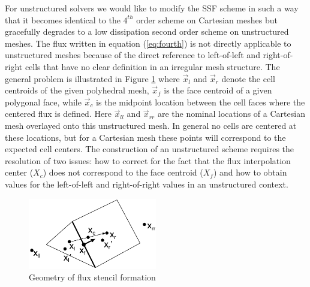 For unstructured solvers we would like to modify the SSF scheme in
such a way that it becomes identical to the $4^{th}$ order scheme on
Cartesian meshes but gracefully degrades to a low dissipation second
order scheme on unstructured meshes.  The flux written in equation
(\ref{eq:fourth}) is not directly applicable to unstructured meshes
because of the direct reference to left-of-left and right-of-right
cells that have no clear definition in an irregular mesh structure.
The general problem is illustrated in Figure \ref{fig:stencil}
where $\vec{x}_l$ and $\vec{x}_r$ denote the cell centroids of the
given polyhedral mesh, $\vec{x}_f$ is the face centroid of a given
polygonal face, while $\vec{x}_c$ is the midpoint location between
the cell faces where the centered flux is defined.  Here
$\vec{x}_{ll}$ and $\vec{x}_{rr}$ are the nominal locations of a
Cartesian mesh overlayed onto this unstructured mesh.  In general no
cells are centered at these locations, but for a Cartesian mesh these
points will correspond to the expected cell centers.  The construction
of an unstructured scheme requires the resolution of two issues: how
to correct for the fact that the flux interpolation center ($X_c$)
does not correspond to the face centroid ($X_f$) and how to obtain
values for the left-of-left and right-of-right values in an
unstructured context.

\begin{figure}[h]
\begin{center}
\includegraphics[width=0.5\textwidth]{flux_correct}
\caption{Geometry of flux stencil formation}
\label{fig:stencil}
\end{center}
\end{figure}


